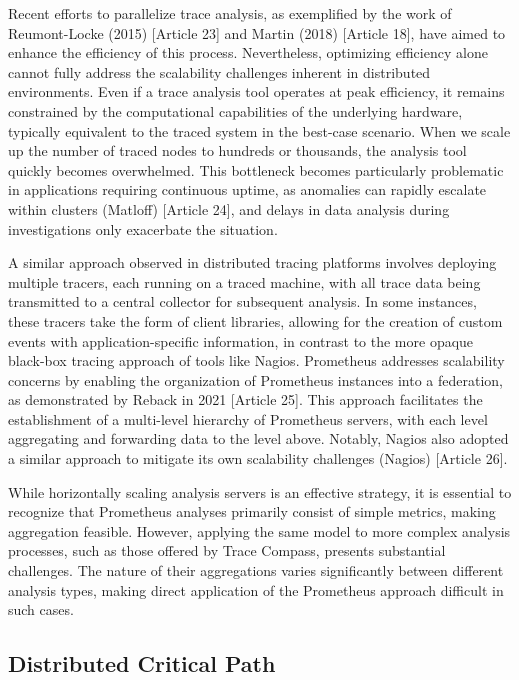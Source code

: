 Recent efforts to parallelize trace analysis, as exemplified by the work of Reumont-Locke (2015) [Article 23] and Martin (2018) [Article 18], have aimed to enhance the efficiency of this process. Nevertheless, optimizing efficiency alone cannot fully address the scalability challenges inherent in distributed environments. Even if a trace analysis tool operates at peak efficiency, it remains constrained by the computational capabilities of the underlying hardware, typically equivalent to the traced system in the best-case scenario. When we scale up the number of traced nodes to hundreds or thousands, the analysis tool quickly becomes overwhelmed. This bottleneck becomes particularly problematic in applications requiring continuous uptime, as anomalies can rapidly escalate within clusters (Matloff) [Article 24], and delays in data analysis during investigations only exacerbate the situation.

A similar approach observed in distributed tracing platforms involves deploying multiple tracers, each running on a traced machine, with all trace data being transmitted to a central collector for subsequent analysis. In some instances, these tracers take the form of client libraries, allowing for the creation of custom events with application-specific information, in contrast to the more opaque black-box tracing approach of tools like Nagios. Prometheus addresses scalability concerns by enabling the organization of Prometheus instances into a federation, as demonstrated by Reback in 2021 [Article 25]. This approach facilitates the establishment of a multi-level hierarchy of Prometheus servers, with each level aggregating and forwarding data to the level above. Notably, Nagios also adopted a similar approach to mitigate its own scalability challenges (Nagios) [Article 26].

While horizontally scaling analysis servers is an effective strategy, it is essential to recognize that Prometheus analyses primarily consist of simple metrics, making aggregation feasible. However, applying the same model to more complex analysis processes, such as those offered by Trace Compass, presents substantial challenges. The nature of their aggregations varies significantly between different analysis types, making direct application of the Prometheus approach difficult in such cases.

\subsection{Distributed Critical Path}

